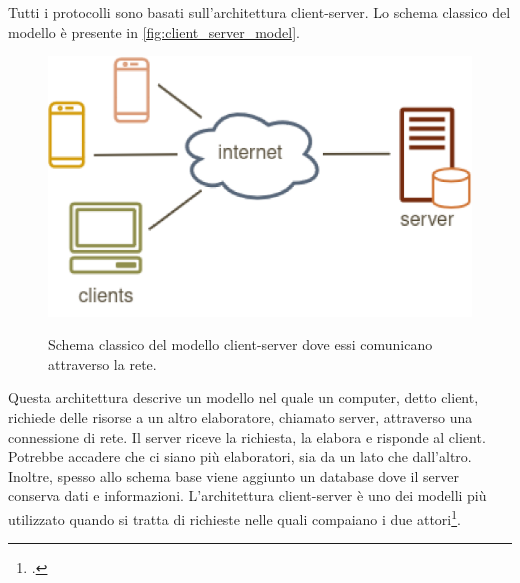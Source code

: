 \documentclass[./main.tex]{subfiles}
\begin{document}
Tutti i protocolli sono basati sull'architettura client-server. Lo schema classico del modello è presente in \autoref{fig:client_server_model}.
\begin{figure}[!ht]
\noindent\begin{minipage}{0.5\textwidth}
\vspace{1cm}
\includegraphics[width=\textwidth]{images/client-server-model.pdf}
\captionsetup{font=small, hypcap=false}
\label{fig:client_server_model}
\end{minipage}
\hspace{0.05\textwidth}
\begin{minipage}{0.4\textwidth}
\begin{small}
Schema classico del modello client-server dove essi comunicano attraverso la rete. 
\end{small}
\end{minipage}
\vspace{0.25cm}
\end{figure}
Questa architettura descrive un modello nel quale un computer, detto client, richiede delle risorse a un altro elaboratore, chiamato server, attraverso una connessione di rete. Il server riceve la richiesta, la elabora e risponde al client. Potrebbe accadere che ci siano più elaboratori, sia da un lato che dall'altro. Inoltre, spesso allo schema base viene aggiunto un database dove il server conserva dati e informazioni. L'architettura client-server è uno dei modelli più utilizzato quando si tratta di richieste nelle quali compaiano i due attori\footcite[139-142]{clientServerModel}.\par
\end{document}
